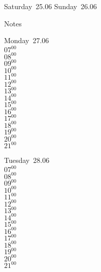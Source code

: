 \documentclass[11pt,a4paper]{book}\usepackage[]{graphicx}\usepackage[]{color}
\begin{document}
\begin{weekendbox}
  Saturday~25.06
  \tcblower
  Sunday~26.06
\end{weekendbox} %
\begin{notebox}
  Notes
\end{notebox}
\clearpage
\begin{headerbox}
\end{headerbox}
\begin{weekdaybox}
  Monday~27.06\\
  { 
  \vfill
  $07^{00}$\\
$08^{00}$\\
$09^{00}$\\
$10^{00}$\\
$11^{00}$\\
$12^{00}$\\
$13^{00}$\\
$14^{00}$\\
$15^{00}$\\
$16^{00}$\\
$17^{00}$\\
$18^{00}$\\
$19^{00}$\\
$20^{00}$\\
$21^{00}$\\
  }
\end{weekdaybox}
\begin{weekdaybox}
  Tuesday~28.06\\
  { 
  \vfill
  $07^{00}$\\
$08^{00}$\\
$09^{00}$\\
$10^{00}$\\
$11^{00}$\\
$12^{00}$\\
$13^{00}$\\
$14^{00}$\\
$15^{00}$\\
$16^{00}$\\
$17^{00}$\\
$18^{00}$\\
$19^{00}$\\
$20^{00}$\\
$21^{00}$\\
  }
\end{weekdaybox}
\end{document}
